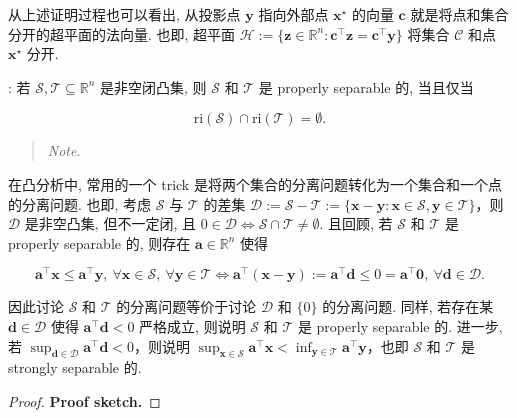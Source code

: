从上述证明过程也可以看出, 从投影点 $\bm{y}$ 指向外部点 $\bm{x}^\star$ 的向量 $\bm{c}$ 就是将点和集合分开的超平面的法向量. 也即, 超平面 $\mathcal{H} := \{\bm{z} \in \mathbb{R}^n: \bm{c}^\top \bm{z} = \bm{c}^\top \bm{y}\}$ 将集合 $\mathcal{C}$ 和点 $\bm{x}^\star$ 分开.


\begin{thmblock}: 若 $\mathcal{S}, \mathcal{T} \subseteq \mathbb{R}^n$ 是非空闭凸集, 则 $\mathcal{S}$ 和 $\mathcal{T}$ 是 properly separable 的, 当且仅当

\[
\text{ri}(\mathcal{S}) \cap \text{ri}(\mathcal{T}) = \emptyset.
\]

\begin{quote}
\emph{Note}.

\end{quote}


\begin{remarkblock}
在凸分析中, 常用的一个 trick 是将两个集合的分离问题转化为一个集合和一个点的分离问题. 也即, 考虑 $\mathcal{S}$ 与 $\mathcal{T}$ 的差集 $\mathcal{D} := \mathcal{S}-\mathcal{T} := \{\bm{x}-\bm{y}: \bm{x} \in \mathcal{S}, \bm{y} \in \mathcal{T}\}$，则 $\mathcal{D}$ 是非空凸集, 但不一定闭, 且 $0 \in \mathcal{D} \iff \mathcal{S} \cap \mathcal{T} \neq \emptyset$. 且回顾, 若 $\mathcal{S}$ 和 $\mathcal{T}$ 是 properly separable 的, 则存在 $\bm{a} \in \mathbb{R}^n$ 使得

\[
\bm{a}^\top \bm{x} \leq \bm{a}^\top \bm{y},~ \forall \bm{x} \in \mathcal{S},~ \forall \bm{y} \in \mathcal{T} 
\iff
\bm{a}^\top (\bm{x}-\bm{y}) := \bm{a}^\top \bm{d} \leq 0 = \bm{a}^\top \bm{0},~ \forall \bm{d} \in \mathcal{D}.
\]

因此讨论 $\mathcal{S}$ 和 $\mathcal{T}$ 的分离问题等价于讨论 $\mathcal{D}$ 和 $\{0\}$ 的分离问题. 同样, 若存在某 $\bm{d} \in \mathcal{D}$ 使得 $\bm{a}^\top \bm{d} < 0$ 严格成立, 则说明 $\mathcal{S}$ 和 $\mathcal{T}$ 是 properly separable 的. 进一步, 若 $\sup_{\bm{d} \in \mathcal{D}} \bm{a}^\top \bm{d} < 0$，则说明 $\sup_{\bm{x} \in \mathcal{S}} \bm{a}^\top \bm{x} < \inf_{\bm{y} \in \mathcal{T}} \bm{a}^\top \bm{y}$，也即 $\mathcal{S}$ 和 $\mathcal{T}$ 是 strongly separable 的.

\end{remarkblock}


\begin{proof}{}
\textbf{Proof sketch.}


\end{proof}
\end{thmblock}

